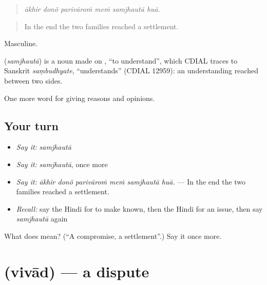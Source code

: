 \begin{quote}
     
\end{quote}

\begin{quote}
\emph{ākhir donõ parivāroṁ meṁ samjhautā huā.}
\end{quote}

\begin{quote}
In the end the two families reached a settlement.
\end{quote}

Masculine.

\begin{cousinweb}
\textbf{} (\emph{samjhautā}) is a noun made on , \textquotedblleft{}to understand\textquotedblright{}, which CDIAL traces to Sanskrit \emph{saṃbudhyate}, \textquotedblleft{}understands\textquotedblright{} (CDIAL 12959): an understanding reached between two sides.
\end{cousinweb}

\begin{grammarlens}[title={What you've built}]
One more word for giving reasons and opinions.
\end{grammarlens}

\subsection*{Your turn}
\begin{itemize}
\raggedright
  \item \emph{Say it:} \emph{samjhautā}
  \item \emph{Say it:} \emph{samjhautā}, once more
  \item \emph{Say it:} \emph{ākhir donõ parivāroṁ meṁ samjhautā huā.} — In the end the two families reached a settlement.
  \item \emph{Recall:} say the Hindi for to make known, then the Hindi for an issue, then say \emph{samjhautā} again
\end{itemize}

\begin{tcolorbox}[breakable,colback=teal!4,colframe=teal!35!black,title={Before you move on}]
What does  mean? (\textquotedblleft{}A compromise, a settlement\textquotedblright{}.) Say it once more.
\end{tcolorbox}
\section[\texorpdfstring{\hi{विवाद} (vivād)}{विवाद (vivād)}]{ (vivād) — a dispute}

